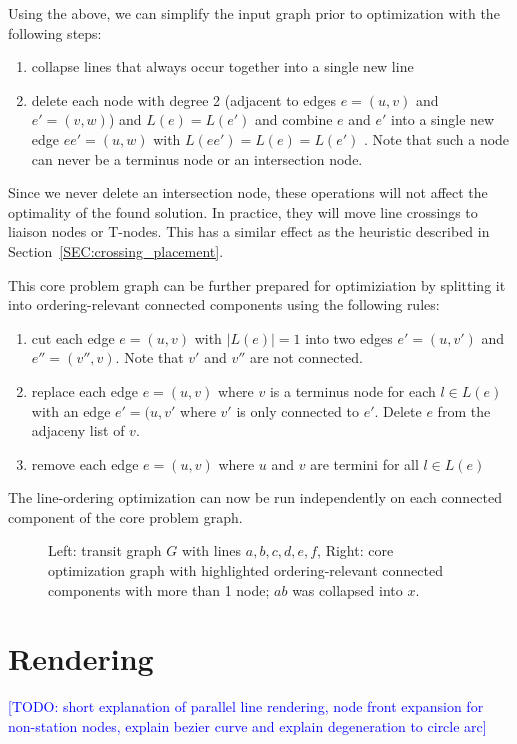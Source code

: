 \documentclass{llncs}
\newcommand\todo[1]{\textcolor{blue}{[TODO: #1]}}
\begin{document}
Using the above, we can simplify the input graph prior to optimization with the following steps:
\begin{enumerate}
\item collapse lines that always occur together into a single new line
\item delete each node with degree 2 (adjacent to edges $e = (u, v)$ and $e' = (v, w)$) and $L(e) = L(e')$ and combine $e$ and $e'$ into a single new edge $ee' = (u, w)$ with $L(ee') = L(e) = L(e')$ . Note that such a node can never be a terminus node or an intersection node.
\end{enumerate}
Since we never delete an intersection node, these operations will not affect the optimality of the found solution. In practice, they will move line crossings to liaison nodes or T-nodes. This has a similar effect as the heuristic described in Section~\ref{SEC:crossing_placement}.

This core problem graph can be further prepared for optimiziation by splitting it into ordering-relevant connected components using the following rules:
\begin{enumerate}
	\item cut each edge $e = (u, v)$ with $|L(e)| = 1$ into two edges $e' = (u, v')$ and $e'' = (v'', v)$. Note that $v'$ and $v''$ are not connected.
	\item replace each edge $e = (u, v)$ where $v$ is a terminus node for each $l \in L(e)$ with an edge $e' = (u, v'$ where $v'$ is only connected to $e'$. Delete $e$ from the adjaceny list of $v$.
	\item remove each edge $e = (u, v)$ where $u$ and $v$ are termini for all $l \in L(e)$
\end{enumerate}
The line-ordering optimization can now be run independently on each connected component of the core problem graph.
\begin{figure}[h]
\centering
	
	\hspace{0.6cm}
	
	\caption{Left: transit graph $G$ with lines $a, b, c, d, e, f$, Right: core optimization graph with highlighted ordering-relevant connected components with more than 1 node; $ab$ was collapsed into $x$.}
\end{figure}

%
\section{Rendering}\label{SEC:rendering}
%
\todo{short explanation of parallel line rendering, node front expansion for non-station nodes, explain bezier curve and explain degeneration to circle arc}
\end{document}
